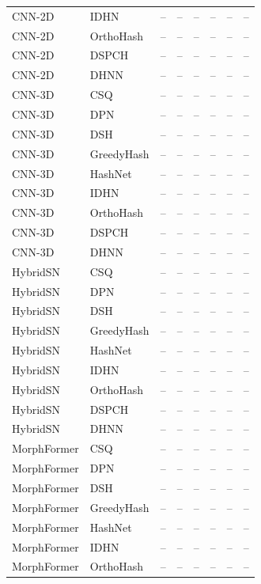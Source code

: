 \begin{longtable}{llrrrrrr}
CNN-2D & IDHN & -- & -- & -- & -- & -- & -- \\
CNN-2D & OrthoHash & -- & -- & -- & -- & -- & -- \\
CNN-2D & DSPCH & -- & -- & -- & -- & -- & -- \\
CNN-2D & DHNN & -- & -- & -- & -- & -- & -- \\
\addlinespace
CNN-3D & CSQ & -- & -- & -- & -- & -- & -- \\
CNN-3D & DPN & -- & -- & -- & -- & -- & -- \\
CNN-3D & DSH & -- & -- & -- & -- & -- & -- \\
CNN-3D & GreedyHash & -- & -- & -- & -- & -- & -- \\
CNN-3D & HashNet & -- & -- & -- & -- & -- & -- \\
CNN-3D & IDHN & -- & -- & -- & -- & -- & -- \\
CNN-3D & OrthoHash & -- & -- & -- & -- & -- & -- \\
CNN-3D & DSPCH & -- & -- & -- & -- & -- & -- \\
CNN-3D & DHNN & -- & -- & -- & -- & -- & -- \\
\addlinespace
HybridSN & CSQ & -- & -- & -- & -- & -- & -- \\
HybridSN & DPN & -- & -- & -- & -- & -- & -- \\
HybridSN & DSH & -- & -- & -- & -- & -- & -- \\
HybridSN & GreedyHash & -- & -- & -- & -- & -- & -- \\
HybridSN & HashNet & -- & -- & -- & -- & -- & -- \\
HybridSN & IDHN & -- & -- & -- & -- & -- & -- \\
HybridSN & OrthoHash & -- & -- & -- & -- & -- & -- \\
HybridSN & DSPCH & -- & -- & -- & -- & -- & -- \\
HybridSN & DHNN & -- & -- & -- & -- & -- & -- \\
\addlinespace
MorphFormer & CSQ & -- & -- & -- & -- & -- & -- \\
MorphFormer & DPN & -- & -- & -- & -- & -- & -- \\
MorphFormer & DSH & -- & -- & -- & -- & -- & -- \\
MorphFormer & GreedyHash & -- & -- & -- & -- & -- & -- \\
MorphFormer & HashNet & -- & -- & -- & -- & -- & -- \\
MorphFormer & IDHN & -- & -- & -- & -- & -- & -- \\
MorphFormer & OrthoHash & -- & -- & -- & -- & -- & -- \\

\end{longtable}
